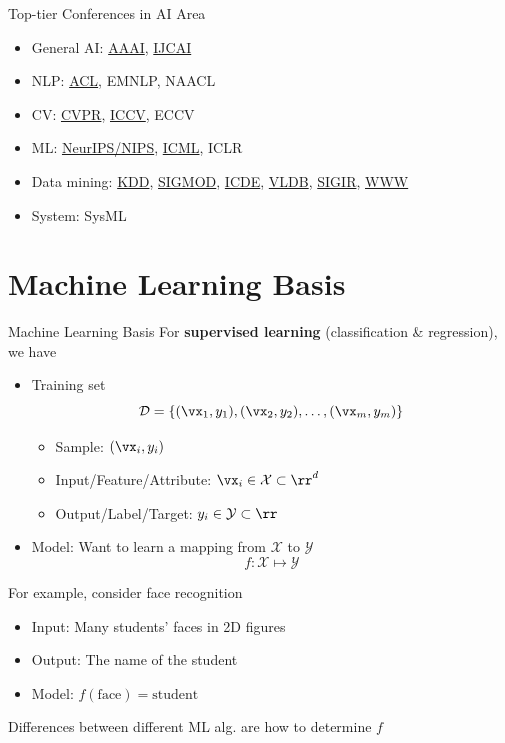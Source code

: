 \documentclass{../TexTemplate/myslide}
\begin{document}
\begin{frame}{Top-tier Conferences in AI Area}
\begin{itemize}
	\item General AI: \underline{AAAI}, \underline{IJCAI}
	\item NLP: \underline{ACL}, EMNLP, NAACL
	\item CV: \underline{CVPR}, \underline{ICCV}, ECCV
	\item ML: \underline{NeurIPS/NIPS}, \underline{ICML}, ICLR
	\item Data mining: \underline{KDD}, \underline{SIGMOD}, \underline{ICDE}, \underline{VLDB}, \underline{SIGIR}, \underline{WWW}
	\item System: SysML
\end{itemize}
\end{frame}

\section{Machine Learning Basis}
\begin{frame}
\sectionpage
\end{frame}

\begin{frame}{Machine Learning Basis}
For \textbf{supervised learning} (classification \& regression), we have
\begin{itemize}
	\item Training set
	\[\mathcal{D}=\{(\vx_1,y_1),(\vx_2,y_2),\ldots,(\vx_m,y_m)\}\]
	\begin{itemize}
		\item Sample: $(\vx_i,y_i)$
		\item Input/Feature/Attribute: $\vx_i\in\mathcal{X}\subset\rr^d$
		\item Output/Label/Target: $y_i\in\mathcal{Y}\subset\rr$
	\end{itemize}
	\item Model: Want to learn a mapping from $\mathcal{X}$ to $\mathcal{Y}$
	\[f:\mathcal{X}\mapsto\mathcal{Y}\]
\end{itemize}
For example, consider face recognition
\begin{itemize}
	\item Input: Many students' faces in 2D figures
	\item Output: The name of the student
	\item Model: $f(\text{face})=\text{student}$
\end{itemize}
Differences between different ML alg. are how to determine $f$
\end{frame}
\end{document}
